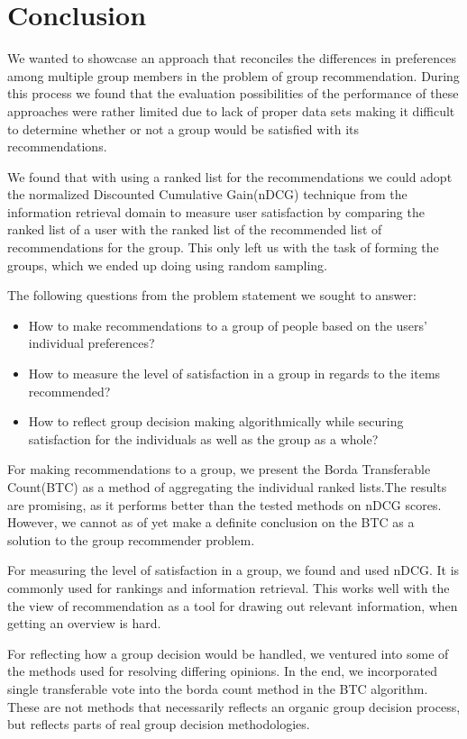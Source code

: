 \chapter{Conclusion} \label{ch:conclusion}
We wanted to showcase an approach that reconciles the differences in preferences among multiple group members in the problem of group recommendation. During this process we found that the evaluation possibilities of the performance of these approaches were rather limited due to lack of proper data sets making it difficult to determine whether or not a group would be satisfied with its recommendations.


We found that with using a ranked list for the recommendations we could adopt the normalized Discounted Cumulative Gain(nDCG) technique from the information retrieval domain to measure user satisfaction by comparing the ranked list of a user with the ranked list of the recommended list of recommendations for the group. This only left us with the task of forming the groups, which we ended up doing using random sampling.


The following questions from the problem statement we sought to answer:
\begin{itemize}
	\item How to make recommendations to a group of people based on the users' individual preferences?
	\item How to measure the level of satisfaction in a group in regards to the items recommended?
	\item How to reflect group decision making algorithmically while securing satisfaction for the individuals as well as the group as a whole?
\end{itemize}


For making recommendations to a group, we present the Borda Transferable Count(BTC) as a method of aggregating the individual ranked lists.The results are promising, as it performs better than the tested methods on nDCG scores. However, we cannot as of yet make a definite conclusion on the BTC as a solution to the group recommender problem.


For measuring the level of satisfaction in a group, we found and used nDCG. It is commonly used for rankings and information retrieval. This works well with the the view of recommendation as a tool for drawing out relevant information, when getting an overview is hard.


For reflecting how a group decision would be handled, we ventured into some of the methods used for resolving differing opinions. In the end, we incorporated single transferable vote into the borda count method in the BTC algorithm. These are not methods that necessarily reflects an organic group decision process, but reflects parts of real group decision methodologies.

